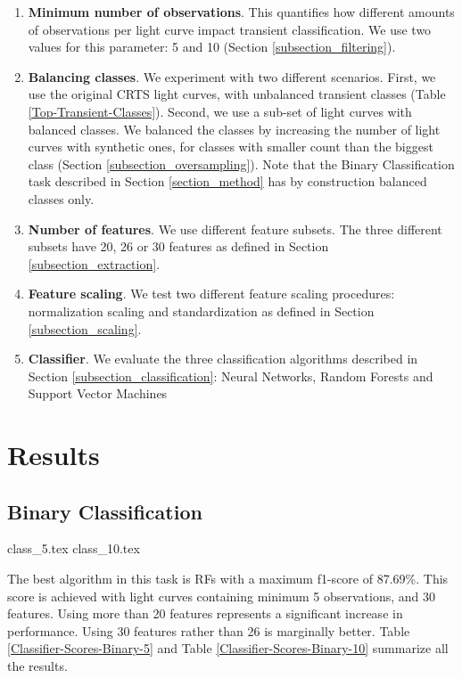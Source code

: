 \documentclass[a4paper,fleqn,usenatbib]{mnras}
\begin{document}
\begin{enumerate}
    \item \textbf{Minimum number of observations}. 
      This quantifies how  different amounts of observations
      per light curve impact transient classification.
      We use two values for this parameter: 5 and 10 (Section \ref{subsection_filtering}). 
    \item \textbf{Balancing classes}. 
      We experiment with two different scenarios.
      First, we use the original CRTS light curves, with unbalanced transient classes (Table
      \ref{Top-Transient-Classes}).
      Second, we use a sub-set of light curves with balanced classes. 
      We balanced the classes by increasing the number of light 
      curves with synthetic ones, for classes with smaller count than the biggest class (Section
      \ref{subsection_oversampling}).
      Note that the Binary Classification task described in Section
      \ref{section_method} has by construction balanced classes only.
    
    \item \textbf{Number of features}. 
      We use different feature subsets. 
      The three different subsets have 20, 26 or 30 features as
      defined in Section \ref{subsection_extraction}. 
    \item \textbf{Feature scaling}. 
      We test two different feature scaling procedures: normalization
      scaling and standardization as defined in Section
      \ref{subsection_scaling}. 
    \item \textbf{Classifier}. 
      We evaluate the three classification algorithms described in Section 
      \ref{subsection_classification}: Neural Networks, 
      Random Forests and Support Vector Machines 
\end{enumerate}


\section{Results} 
\label{section_results}

\subsection{Binary Classification} 
\label{Results-Binary} 

{class_5.tex}
{class_10.tex}


The best algorithm in this task is RFs with a maximum f1-score of
87.69\%.   
This score is achieved with light curves containing minimum 5
observations, and 30 features.
Using more than 20 features represents a significant increase in
performance.
Using 30 features rather than 26 is marginally better. 
Table \ref{Classifier-Scores-Binary-5} and Table 
\ref{Classifier-Scores-Binary-10} summarize all the results.
\end{document}
